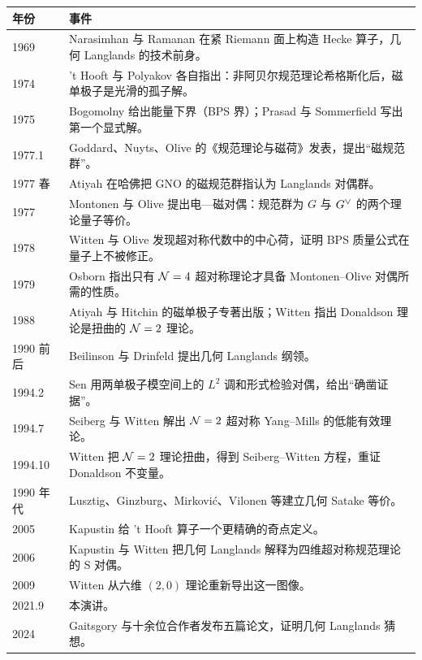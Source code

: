 \begin{center}\small
\begin{longtable}{@{}p{2.1cm}p{10.9cm}@{}}
\toprule
\textbf{年份} & \textbf{事件} \\
\midrule
\endhead
1969 & Narasimhan 与 Ramanan 在紧 Riemann 面上构造 Hecke 算子，几何 Langlands 的技术前身。\\
1974 & 't Hooft 与 Polyakov 各自指出：非阿贝尔规范理论希格斯化后，磁单极子是光滑的孤子解。\\
1975 & Bogomolny 给出能量下界（BPS 界）；Prasad 与 Sommerfield 写出第一个显式解。\\
1977.1 & Goddard、Nuyts、Olive 的《规范理论与磁荷》发表，提出“磁规范群”。\\
1977 春 & Atiyah 在哈佛把 GNO 的磁规范群指认为 Langlands 对偶群。\\
1977 & Montonen 与 Olive 提出电—磁对偶：规范群为 $G$ 与 $G^{\vee}$ 的两个理论量子等价。\\
1978 & Witten 与 Olive 发现超对称代数中的中心荷，证明 BPS 质量公式在量子上不被修正。\\
1979 & Osborn 指出只有 $\mathcal{N}=4$ 超对称理论才具备 Montonen--Olive 对偶所需的性质。\\
1988 & Atiyah 与 Hitchin 的磁单极子专著出版；Witten 指出 Donaldson 理论是扭曲的 $\mathcal{N}=2$ 理论。\\
1990 前后 & Beilinson 与 Drinfeld 提出几何 Langlands 纲领。\\
1994.2 & Sen 用两单极子模空间上的 $L^2$ 调和形式检验对偶，给出“确凿证据”。\\
1994.7 & Seiberg 与 Witten 解出 $\mathcal{N}=2$ 超对称 Yang--Mills 的低能有效理论。\\
1994.10 & Witten 把 $\mathcal{N}=2$ 理论扭曲，得到 Seiberg--Witten 方程，重证 Donaldson 不变量。\\
1990 年代 & Lusztig、Ginzburg、Mirković、Vilonen 等建立几何 Satake 等价。\\
2005 & Kapustin 给 't Hooft 算子一个更精确的奇点定义。\\
2006 & Kapustin 与 Witten 把几何 Langlands 解释为四维超对称规范理论的 S 对偶。\\
2009 & Witten 从六维 $(2,0)$ 理论重新导出这一图像。\\
2021.9 & 本演讲。\\
2024 & Gaitsgory 与十余位合作者发布五篇论文，证明几何 Langlands 猜想。\\
\bottomrule
\end{longtable}
\end{center}

